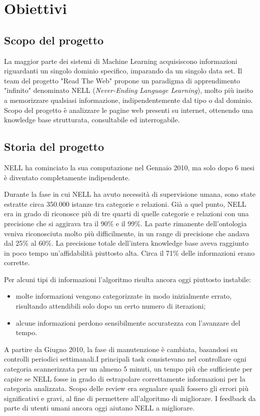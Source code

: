 \section{Obiettivi}

\subsection{Scopo del progetto}
La maggior parte dei sistemi di Machine Learning acquisiscono informazioni riguardanti un singolo dominio specifico, imparando da un singolo data set.
Il team del progetto "Read The Web" propone un paradigma di apprendimento "infinito" denominato NELL (\textit{Never-Ending Language Learning}), molto più insito a memorizzare qualsiasi informazione, indipendentemente dal tipo o dal dominio. Scopo del progetto è analizzare le pagine web presenti su internet, ottenendo una knowledge base strutturata, consultabile ed interrogabile.
\subsection{Storia del progetto}
NELL ha cominciato la sua computazione nel Gennaio 2010, ma solo dopo 6 mesi è diventato completamente indipendente.

\noindent Durante la fase in cui NELL ha avuto necessità di supervisione umana, sono state estratte circa 350.000 istanze tra categorie e relazioni. Già a quel punto, NELL era in grado di riconosce più di tre quarti di quelle categorie e relazioni con una precisione che si aggirava tra il 90\% e il 99\%. La parte rimanente dell'ontologia veniva riconosciuta molto più difficilmente, in un range di precisione che andava dal 25\% al 60\%. La precisione totale dell'intera knowledge base aveva raggiunto in poco tempo un'affidabilità piuttosto alta. Circa il 71\% delle informazioni erano corrette.

\noindent Per alcuni tipi di informazioni l'algoritmo risulta ancora oggi piuttosto instabile:
\begin{itemize}
    \item molte informazioni vengono categorizzate in modo inizialmente errato, risultando attendibili solo dopo un certo numero di iterazioni;
    \item alcune informazioni perdono sensibilmente accuratezza con l'avanzare del tempo.
\end{itemize}

\noindent A partire da Giugno 2010, la fase di manutenzione è cambiata, basandosi su controlli periodici settimanali.I principali task consistevano nel controllare ogni categoria scannerizzata per un almeno 5 minuti, un tempo più che sufficiente per capire se NELL fosse in grado di estrapolare correttamente informazioni per la categoria analizzata. Scopo delle review era segnalare quali fossero gli errori più significativi e gravi, al fine di permettere all'algoritmo di migliorare. I feedback da parte di utenti umani ancora oggi aiutano NELL a migliorare.

